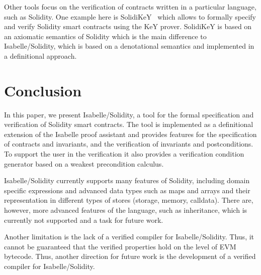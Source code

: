 \documentclass[a4paper,UKenglish,cleveref, autoref, thm-restate]{oasics-v2021}
\begin{document}
Other tools focus on the verification of contracts written in a particular language, such as Solidity.
One example here is SolidiKeY~\cite{ahrendt2020functional} which allows to formally specify and verify Solidity smart contracts using the KeY prover.
SolidiKeY is based on an axiomatic semantics of Solidity which is the main difference to Isabelle/Solidity, which is based on a denotational semantics and implemented in a definitional approach.
% 
 
%


\section{Conclusion}
%
In this paper, we present Isabelle/Solidity, a tool for the formal specification and verification of Solidity smart contracts. 
The tool is implemented as a definitional extension of the Isabelle proof assistant and provides features for the specification of contracts and invariants, and the verification of invariants and postconditions.
To support the user in the verification it also provides a verification condition generator based on a weakest precondition calculus.

Isabelle/Solidity currently supports many features of Solidity, including domain specific expressions and advanced data types such as maps and arrays and their representation in different types of stores (storage, memory, calldata).
There are, however, more advanced features of the language, such as inheritance, which is currently not supported and a task for future work.

Another limitation is the lack of a verified compiler for Isabelle/Solidity.
Thus, it cannot be guaranteed that the verified properties hold on the level of EVM bytecode.
Thus, another direction for future work is the development of a verified compiler for Isabelle/Solidity.
%
\newpage

\end{document}

